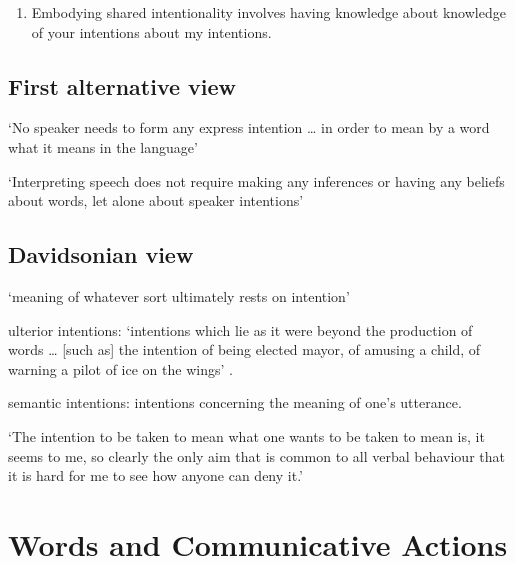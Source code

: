 \documentclass[12pt]{extarticle}
\begin{document}
\begin{multicols}{3}
\begin{enumerate}
\item
 
Embodying shared intentionality involves having knowledge about knowledge of your intentions about my intentions.
 
\end{enumerate}
 
\subsection{First alternative view}
 
‘No speaker needs to form any express intention … in order to mean by a word what it means in the language’
\citep[p.\ 473]{Dummett:1986mq}
 
‘Interpreting speech does not require making any inferences or having any beliefs about words, let alone about speaker intentions’
\citep[p.\ 62]{Millikan:1984ib}
 
\subsection{Davidsonian view}
 
‘meaning of whatever sort ultimately rests on intention’
\citep[p.\ 298]{Davidson:1992pl}
 
ulterior intentions: ‘intentions which lie as it were beyond the production of words … [such as] the intention of being elected mayor, of amusing a child, of warning a pilot of ice on the wings’ \citep[p.\ 298]{Davidson:1992pl}.
 
semantic intentions: intentions concerning the meaning of one’s utterance.
 
‘The intention to be taken to mean what one wants to be taken to mean is, it seems to me, so clearly the only aim that is common to all verbal behaviour that it is hard for me to see how anyone can deny it.’
\citep[p.\ 11]{Davidson:1994ol}
 
 
 
\section{Words and Communicative Actions}
 
 
 
 
\footnotesize 


\end{multicols}
\end{document}
